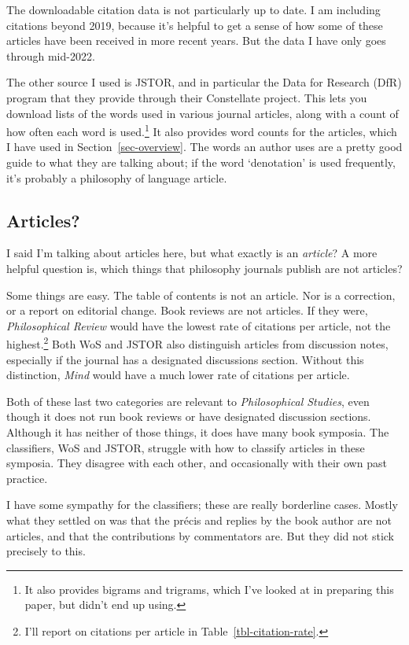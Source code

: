 \documentclass[
  10pt,
  letterpaper,
  DIV=11,
  numbers=noendperiod,
  twoside]{scrartcl}
\begin{document}
The downloadable citation data is not particularly up to date. I am
including citations beyond 2019, because it's helpful to get a sense of
how some of these articles have been received in more recent years. But
the data I have only goes through mid-2022.

The other source I used is JSTOR, and in particular the Data for
Research (DfR) program that they provide through their Constellate
project. This lets you download lists of the words used in various
journal articles, along with a count of how often each word is
used.\footnote{It also provides bigrams and trigrams, which I've looked
  at in preparing this paper, but didn't end up using.} It also provides
word counts for the articles, which I have used in
Section~\ref{sec-overview}. The words an author uses are a pretty good
guide to what they are talking about; if the word `denotation' is used
frequently, it's probably a philosophy of language article.

\subsection{Articles?}\label{sec-what-is-an-article}

I said I'm talking about articles here, but what exactly is an
\emph{article}? A more helpful question is, which things that philosophy
journals publish are not articles?

Some things are easy. The table of contents is not an article. Nor is a
correction, or a report on editorial change. Book reviews are not
articles. If they were, \emph{Philosophical Review} would have the
lowest rate of citations per article, not the highest.\footnote{I'll
  report on citations per article in Table~\ref{tbl-citation-rate}.}
Both WoS and JSTOR also distinguish articles from discussion notes,
especially if the journal has a designated discussions section. Without
this distinction, \emph{Mind} would have a much lower rate of citations
per article.

Both of these last two categories are relevant to \emph{Philosophical
Studies}, even though it does not run book reviews or have designated
discussion sections. Although it has neither of those things, it does
have many book symposia. The classifiers, WoS and JSTOR, struggle with
how to classify articles in these symposia. They disagree with each
other, and occasionally with their own past practice.

I have some sympathy for the classifiers; these are really borderline
cases. Mostly what they settled on was that the précis and replies by
the book author are not articles, and that the contributions by
commentators are. But they did not stick precisely to this.
\end{document}
